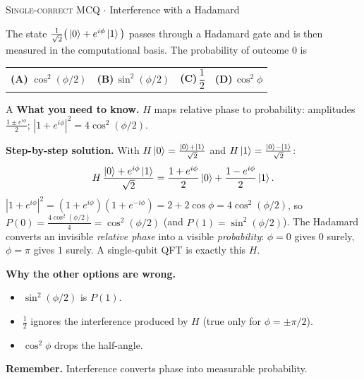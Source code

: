 \documentclass[11pt,a4paper]{article}
\newcommand{\optlabel}[1]{\textbf{(#1)}}
\newcommand{\correctlabel}[1]{\textcolor{okgreen}{\textbf{(#1)}\,\ding{51}}}
\newenvironment{qitem}[1]{\begin{list}{}{\setlength{\leftmargin}{3.3em}\setlength{\labelwidth}{3.1em}%
  \setlength{\labelsep}{0.2em}\setlength{\topsep}{3pt}\setlength{\parsep}{3pt}}\item[\textbf{Q.#1}\hfill]}{\end{list}}
\newcommand{\qsep}{\par\vspace{2pt}{\color{black!15}\hrule}\vspace{4pt}}
\newcommand{\qmeta}[2]{{\footnotesize\color{black!60}\textsc{#1} \;$\cdot$\; #2}\par}
\begin{document}
\begin{qitem}{23}
\qmeta{Single-correct MCQ}{Interference with a Hadamard}
The state $\frac{1}{\sqrt2}\big(\ket{0} + e^{i\phi}\ket{1}\big)$ passes through a Hadamard gate and is then measured
in the computational basis. The probability of outcome $0$ is
\par\smallskip\noindent\begin{tabularx}{\linewidth}{@{}*{4}{L}@{}}
\correctlabel{A}\,$\cos^2(\phi/2)$ & \optlabel{B}\,$\sin^2(\phi/2)$ & \optlabel{C}\,$\dfrac12$ & \optlabel{D}\,$\cos^2\phi$
\end{tabularx}
\end{qitem}
\begin{solbox}{A}
\textbf{\color{brand}What you need to know.} $H$ maps relative phase to probability: amplitudes $\frac{1\pm e^{i\phi}}{2}$; $|1+e^{i\phi}|^2 = 4\cos^2(\phi/2)$.

\textbf{\color{brand}Step-by-step solution.} With $H\ket{0} = \frac{\ket0 + \ket1}{\sqrt2}$ and $H\ket{1} = \frac{\ket0 - \ket1}{\sqrt2}$:
\[ H\,\frac{\ket{0} + e^{i\phi}\ket{1}}{\sqrt2} = \frac{1 + e^{i\phi}}{2}\ket{0} + \frac{1 - e^{i\phi}}{2}\ket{1}. \]
$|1 + e^{i\phi}|^2 = (1 + e^{i\phi})(1 + e^{-i\phi}) = 2 + 2\cos\phi = 4\cos^2(\phi/2)$, so
$P(0) = \frac{4\cos^2(\phi/2)}{4} = \cos^2(\phi/2)$ (and $P(1) = \sin^2(\phi/2)$).
The Hadamard converts an invisible \emph{relative phase} into a visible \emph{probability}: $\phi = 0$ gives $0$ surely,
$\phi = \pi$ gives $1$ surely. A single-qubit QFT is exactly this $H$.

\textbf{\color{brand}Why the other options are wrong.}
\begin{itemize}[leftmargin=2.4em, itemsep=1pt, topsep=2pt]
\item[\textbf{(B)}] $\sin^2(\phi/2)$ is $P(1)$.
\item[\textbf{(C)}] $\frac12$ ignores the interference produced by $H$ (true only for $\phi = \pm\pi/2$).
\item[\textbf{(D)}] $\cos^2\phi$ drops the half-angle.
\end{itemize}
\textbf{\color{brand}Remember.} Interference converts phase into measurable probability.
\end{solbox}
\qsep
\end{document}
